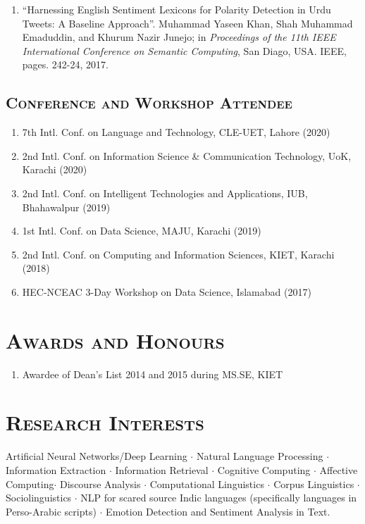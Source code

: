 \documentclass[a4paper, 10pt]{article}
\begin{document}
\begin{enumerate}
  \item ``Harnessing English Sentiment Lexicons for Polarity Detection in Urdu Tweets: A Baseline Approach''. Muhammad Yaseen Khan, Shah Muhammad Emaduddin, and Khurum Nazir Junejo;  in \emph{Proceedings of the 11th IEEE International Conference on Semantic Computing}, San Diago, USA. IEEE, pages. 242-24, 2017.
\end{enumerate}

\subsection*{\normalfont\textsc{Conference and Workshop Attendee}}
\begin{enumerate}
\itemsep-4pt
\item 7th Intl. Conf. on Language and Technology, CLE-UET, Lahore (2020)
\item 2nd Intl. Conf. on Information Science \& Communication Technology, UoK, Karachi (2020)
\item 2nd Intl. Conf. on Intelligent Technologies and Applications, IUB, Bhahawalpur (2019)
\item 1st Intl. Conf. on Data Science, MAJU, Karachi (2019)
\item 2nd Intl. Conf. on Computing and Information Sciences, KIET, Karachi (2018)
\item HEC-NCEAC 3-Day Workshop on Data Science, Islamabad (2017) 
\end{enumerate}

\section*{\normalfont\textsc{Awards and Honours}}
\begin{enumerate}
\itemsep-4pt 
 \item Awardee of Dean's List 2014 and 2015 during MS.SE, KIET
\end{enumerate}

\section*{\normalfont\textsc{Research Interests}}
Artificial Neural Networks/Deep Learning $\cdot$ Natural Language Processing $\cdot$ Information Extraction $\cdot$ Information Retrieval $\cdot$ Cognitive Computing $\cdot$ Affective Computing$\cdot$ Discourse Analysis $\cdot$ Computational Linguistics $\cdot$  Corpus Linguistics $\cdot$ Sociolinguistics $\cdot$ NLP for scared source Indic languages (specifically languages in Perso-Arabic scripts) $\cdot$ Emotion Detection and Sentiment Analysis in Text.
\end{document}
